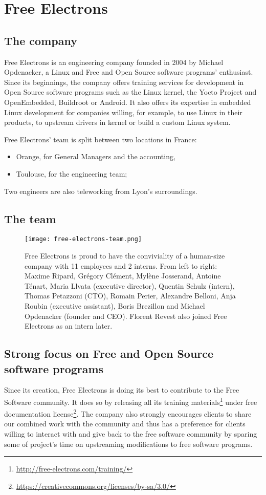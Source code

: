 \chapter{Free Electrons}

\section{The company}
Free Electrons is an engineering company founded in 2004 by Michael Opdenacker, a Linux and Free and Open Source software programs' enthusiast. Since its beginnings, the company offers training services for development in Open Source software programs such as the Linux kernel, the Yocto Project and OpenEmbedded, Buildroot or Android. It also offers its expertise in embedded Linux development for companies willing, for example, to use Linux in their products, to upstream drivers in kernel or build a custom Linux system.

Free Electrons' team is split between two locations in France:
\begin{itemize}
  \item Orange, for General Managers and the accounting,
  \item Toulouse, for the engineering team;
\end{itemize}

Two engineers are also teleworking from Lyon's surroundings.

\section{The team}

\begin{figure}[H]
  \centering
  \texttt{[image: free-electrons-team.png]}
  \caption{Free Electrons is proud to have the conviviality of a human-size company with 11 employees and 2 interns. From left to right: Maxime Ripard, Grégory Clément, Mylène Josserand, Antoine Ténart, Maria Llvata (executive director), Quentin Schulz (intern), Thomas Petazzoni (CTO), Romain Perier, Alexandre Belloni, Anja Roubin (executive assistant), Boris Brezillon and Michael Opdenacker (founder and CEO). Florent Revest also joined Free Electrons as an intern later.}
\end{figure}

\section{Strong focus on Free and Open Source software programs}
Since its creation, Free Electrons is doing its best to contribute to the Free Software community. It does so by releasing all its training materials\footnote{\url{http://free-electrons.com/training/}} under free documentation license\footnote{\url{https://creativecommons.org/licenses/by-sa/3.0/}}. The company also strongly encourages clients to share our combined work with the community and thus has a preference for clients willing to interact with and give back to the free software community by sparing some of project's time on upstreaming modifications to free software programs.


